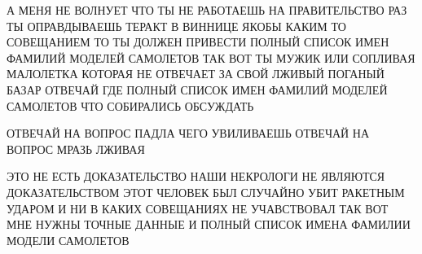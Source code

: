 А МЕНЯ НЕ ВОЛНУЕТ ЧТО ТЫ НЕ РАБОТАЕШЬ НА ПРАВИТЕЛЬСТВО РАЗ ТЫ ОПРАВДЫВАЕШЬ
ТЕРАКТ В ВИННИЦЕ ЯКОБЫ КАКИМ ТО СОВЕЩАНИЕМ ТО ТЫ ДОЛЖЕН ПРИВЕСТИ ПОЛНЫЙ СПИСОК
ИМЕН ФАМИЛИЙ МОДЕЛЕЙ САМОЛЕТОВ ТАК ВОТ ТЫ МУЖИК ИЛИ СОПЛИВАЯ МАЛОЛЕТКА КОТОРАЯ
НЕ ОТВЕЧАЕТ ЗА СВОЙ ЛЖИВЫЙ ПОГАНЫЙ БАЗАР ОТВЕЧАЙ ГДЕ ПОЛНЫЙ СПИСОК ИМЕН ФАМИЛИЙ
МОДЕЛЕЙ САМОЛЕТОВ ЧТО СОБИРАЛИСЬ ОБСУЖДАТЬ

ОТВЕЧАЙ НА ВОПРОС ПАДЛА ЧЕГО УВИЛИВАЕШЬ ОТВЕЧАЙ НА ВОПРОС МРАЗЬ ЛЖИВАЯ

ЭТО НЕ ЕСТЬ ДОКАЗАТЕЛЬСТВО НАШИ НЕКРОЛОГИ НЕ ЯВЛЯЮТСЯ ДОКАЗАТЕЛЬСТВОМ ЭТОТ
ЧЕЛОВЕК БЫЛ СЛУЧАЙНО УБИТ РАКЕТНЫМ УДАРОМ И НИ В КАКИХ СОВЕЩАНИЯХ НЕ
УЧАВСТВОВАЛ ТАК ВОТ МНЕ НУЖНЫ ТОЧНЫЕ ДАННЫЕ И ПОЛНЫЙ СПИСОК ИМЕНА ФАМИЛИИ
МОДЕЛИ САМОЛЕТОВ
